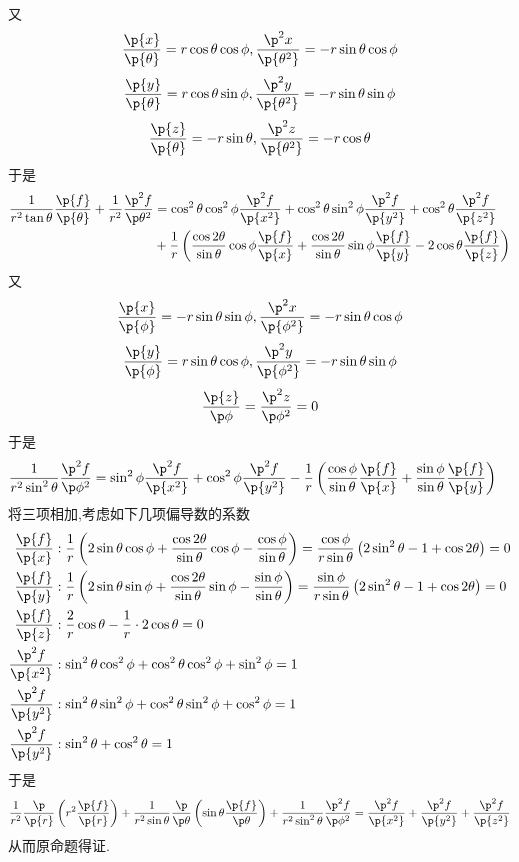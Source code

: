 \documentclass{ctexart}
\begin{document}
\begin{solution}[Proof.]
$$\begin{aligned}
    \end{aligned}$$
    又
    $$\dfrac{\p{x}}{\p{\theta}}=r\cos\theta\cos\phi,\dfrac{\p^2x}{\p{\theta^2}}=-r\sin\theta\cos\phi$$
    $$\dfrac{\p{y}}{\p{\theta}}=r\cos\theta\sin\phi,\dfrac{\p^2y}{\p{\theta^2}}=-r\sin\theta\sin\phi$$
    $$\dfrac{\p{z}}{\p{\theta}}=-r\sin\theta,\dfrac{\p^2z}{\p{\theta^2}}=-r\cos\theta$$
    于是
    $$\begin{aligned}
        \dfrac{1}{r^2\tan\theta}\dfrac{\p{f}}{\p{\theta}}+\dfrac{1}{r^2}\dfrac{\p^2f}{\p\theta^2}
        &= \cos^2\theta\cos^2\phi\dfrac{\p^2f}{\p{x^2}}+\cos^2\theta\sin^2\phi\dfrac{\p^2f}{\p{y^2}}+\cos^2\theta\dfrac{\p^2f}{\p{z^2}} \\
        &+ \dfrac{1}{r}\left(\dfrac{\cos2\theta}{\sin\theta}\cos\phi\dfrac{\p{f}}{\p{x}}+\dfrac{\cos2\theta}{\sin\theta}\sin\phi\dfrac{\p{f}}{\p{y}}-2\cos\theta\dfrac{\p{f}}{\p{z}}\right)
    \end{aligned}$$
    又
    $$\dfrac{\p{x}}{\p{\phi}}=-r\sin\theta\sin\phi,\dfrac{\p^2{x}}{\p{\phi^2}}=-r\sin\theta\cos\phi$$
    $$\dfrac{\p{y}}{\p{\phi}}=r\sin\theta\cos\phi,\dfrac{\p^2{y}}{\p{\phi^2}}=-r\sin\theta\sin\phi$$
    $$\dfrac{\p{z}}{\p\phi}=\dfrac{\p^2z}{\p\phi^2}=0$$
    于是
    $$\begin{aligned}
        \dfrac{1}{r^2\sin^2\theta}\dfrac{\p^2f}{\p\phi^2}
        &=\sin^2\phi\dfrac{\p^2f}{\p{x^2}}+\cos^2\phi\dfrac{\p^2f}{\p{y^2}}-\dfrac{1}{r}\left(\dfrac{\cos\phi}{\sin\theta}\dfrac{\p{f}}{\p{x}}+\dfrac{\sin\phi}{\sin\theta}\dfrac{\p{f}}{\p{y}}\right)
    \end{aligned}$$
    将三项相加,考虑如下几项偏导数的系数
    $$\begin{aligned}
        \dfrac{\p{f}}{\p{x}}&:\dfrac{1}{r}\left(2\sin\theta\cos\phi+\dfrac{\cos2\theta}{\sin\theta}\cos\phi-\dfrac{\cos\phi}{\sin\theta}\right)=\dfrac{\cos\phi}{r\sin\theta}\left(2\sin^2\theta-1+\cos2\theta\right)=0\\
        \dfrac{\p{f}}{\p{y}}&:\dfrac{1}{r}\left(2\sin\theta\sin\phi+\dfrac{\cos2\theta}{\sin\theta}\sin\phi-\dfrac{\sin\phi}{\sin\theta}\right)=\dfrac{\sin\phi}{r\sin\theta}\left(2\sin^2\theta-1+\cos2\theta\right)=0\\
        \dfrac{\p{f}}{\p{z}}&:\dfrac{2}{r}\cos\theta-\dfrac{1}{r}\cdot2\cos\theta=0\\
        \dfrac{\p^2{f}}{\p{x^2}}&:\sin^2\theta\cos^2\phi+\cos^2\theta\cos^2\phi+\sin^2\phi=1\\
        \dfrac{\p^2{f}}{\p{y^2}}&:\sin^2\theta\sin^2\phi+\cos^2\theta\sin^2\phi+\cos^2\phi=1\\
        \dfrac{\p^2{f}}{\p{y^2}}&:\sin^2\theta+\cos^2\theta=1
    \end{aligned}$$
    于是
    $$\dfrac{1}{r^2}\dfrac{\p}{\p{r}}\left(r^2\dfrac{\p{f}}{\p{r}}\right)+\dfrac{1}{r^2\sin\theta}\dfrac{\p}{\p\theta}\left(\sin\theta\dfrac{\p{f}}{\p\theta}\right)+\dfrac{1}{r^2\sin^2\theta}\dfrac{\p^2f}{\p\phi^2}
    =\dfrac{\p^2f}{\p{x^2}}+\dfrac{\p^2f}{\p{y^2}}+\dfrac{\p^2f}{\p{z^2}}$$
    从而原命题得证.
\end{solution}
\end{document}

